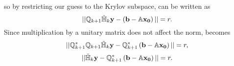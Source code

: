 so by restricting our guess to the Krylov subspace,  can be written as 
\begin{equation}\label{eq:shutUpMatt}
|| \mathbb{Q}_{k+1}\tilde{\mathbb{H}}_k \mathbf{y} - \left ( \mathbf{b}-\mathbb{A}\mathbf{x_0} \right ) || = r.
\end{equation}
Since multiplication by a unitary matrix does not affect the norm,  becomes
\begin{equation}\label{eq:UNIMATRIX}
|| \mathbb{Q}^*_{k+1}\mathbb{Q}_{k+1}\tilde{\mathbb{H}}_k \mathbf{y} - \mathbb{Q}^*_{k+1}\left ( \mathbf{b}-\mathbb{A}\mathbf{x_0} \right )|| = r,
\end{equation}
\begin{equation}
||\tilde{\mathbb{H}}_k \mathbf{y} - \mathbb{Q}^*_{k+1}\left ( \mathbf{b}-\mathbb{A}\mathbf{x_0} \right )|| = r. 
\end{equation}

